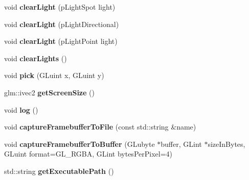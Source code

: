 \begin{DoxyCompactItemize}
\item 
\hypertarget{classfillwave_1_1Engine_a487281fb62a0e3469759afb0ad0f4708}{}void {\bfseries clear\+Light} (p\+Light\+Spot light)\label{classfillwave_1_1Engine_a487281fb62a0e3469759afb0ad0f4708}

\item 
\hypertarget{classfillwave_1_1Engine_a68cf4c1c889f24ac5f7d39a26e3a0c7d}{}void {\bfseries clear\+Light} (p\+Light\+Directional)\label{classfillwave_1_1Engine_a68cf4c1c889f24ac5f7d39a26e3a0c7d}

\item 
\hypertarget{classfillwave_1_1Engine_a54d9508e54fc6e503701c52704027c82}{}void {\bfseries clear\+Light} (p\+Light\+Point light)\label{classfillwave_1_1Engine_a54d9508e54fc6e503701c52704027c82}

\item 
\hypertarget{classfillwave_1_1Engine_a6e6a32a9f0731403d647f76c73c954c1}{}void {\bfseries clear\+Lights} ()\label{classfillwave_1_1Engine_a6e6a32a9f0731403d647f76c73c954c1}

\item 
\hypertarget{classfillwave_1_1Engine_a6433c8aa182194e019b5a8003a541ad8}{}void {\bfseries pick} (G\+Luint x, G\+Luint y)\label{classfillwave_1_1Engine_a6433c8aa182194e019b5a8003a541ad8}

\item 
\hypertarget{classfillwave_1_1Engine_a274fbb9bafca3ddb3bc023d502832a56}{}glm\+::ivec2 {\bfseries get\+Screen\+Size} ()\label{classfillwave_1_1Engine_a274fbb9bafca3ddb3bc023d502832a56}

\item 
\hypertarget{classfillwave_1_1Engine_a622e9159a52582ac0fadd7be6ad2d31a}{}void {\bfseries log} ()\label{classfillwave_1_1Engine_a622e9159a52582ac0fadd7be6ad2d31a}

\item 
\hypertarget{classfillwave_1_1Engine_a4e08aacaa4023e9a2688ed4fd0b4bd31}{}void {\bfseries capture\+Framebuffer\+To\+File} (const std\+::string \&name)\label{classfillwave_1_1Engine_a4e08aacaa4023e9a2688ed4fd0b4bd31}

\item 
\hypertarget{classfillwave_1_1Engine_a0d0b79df4b9f1589c526cdb7fbc0a968}{}void {\bfseries capture\+Framebuffer\+To\+Buffer} (G\+Lubyte $\ast$buffer, G\+Lint $\ast$size\+In\+Bytes, G\+Luint format=G\+L\+\_\+\+R\+G\+B\+A, G\+Lint bytes\+Per\+Pixel=4)\label{classfillwave_1_1Engine_a0d0b79df4b9f1589c526cdb7fbc0a968}

\item 
\hypertarget{classfillwave_1_1Engine_ac50d81326985c03d55b71964d12e7688}{}std\+::string {\bfseries get\+Executable\+Path} ()\label{classfillwave_1_1Engine_ac50d81326985c03d55b71964d12e7688}


\end{DoxyCompactItemize}

